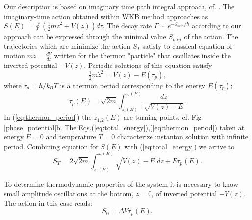 \documentclass[aps, pre, preprint, groupedaddress, superscriptaddress, showkeys, showpacs] {revtex4-1}
\begin{document}
Our description is based on imaginary time path integral approach, cf. \cite{Ankerhold}.
The imaginary-time action obtained within WKB method approaches as $S(E) = \oint (\tfrac{1}{2} m \dot{z}^2 + V(z)) d \tau$.
%
%
The decay rate $\Gamma \sim e^{-S_{min}/\hbar}$ according to our approach can be expressed through the minimal value $S_{min}$ of the action.
The trajectories which are minimize the action $S_T$ satisfy to classical equation of motion $m \ddot{z} = \frac{d V}{dz}$ written for the thermon "particle" that  oscillates inside the inverted potential $-V(z)$. 
%
%
Periodic solutions of this equation satisfy
%
\begin{equation}
\tfrac{1}{2} m \dot{z}^2 = V(z) - E(\tau_p),
\label{eq:total_energy}
\end{equation}
%
where $\tau_p = \hbar / k_B T$ is a thermon period corresponding to the energy $E(\tau_p)$;
%
\begin{equation}
\tau_p(E) = \sqrt{2 m} \int_{z_1(E)}^{z_2(E)} \frac{dz}{\sqrt{V(z) - E}}.
\label{eq:thermon_period}
\end{equation}
%
In (\ref{eq:thermon_period}) the $z_{1,2}(E)$ are turning points, cf. Fig. \ref{phase_potential}b.
The Eqs.(\ref{eq:total_energy}),(\ref{eq:thermon_period}) taken at energy $E = 0$ and temperature $T = 0$ characterize instanton solution with infinite period.
Combining  equation for $S(E)$ 
with (\ref{eq:total_energy}) we arrive to 
%
\begin{equation}
S_T = 2 \sqrt{2 m} \int_{z_1(E)}^{z_2(E)} \sqrt{V(z) - E} ~dz + E \tau_p (E).
\label{eq:thermon_action_2}
\end{equation}
%

To determine thermodynamic properties of the system it is necessary to know small amplitude oscillations  at the bottom, $z=0$, of inverted potential $-V(z)$.
The action in this case reads: 
%
\begin{equation}
S_0 = \Delta V \tau_p (E).
\label{eq:thermal_action}
\end{equation}
%
\end{document}
